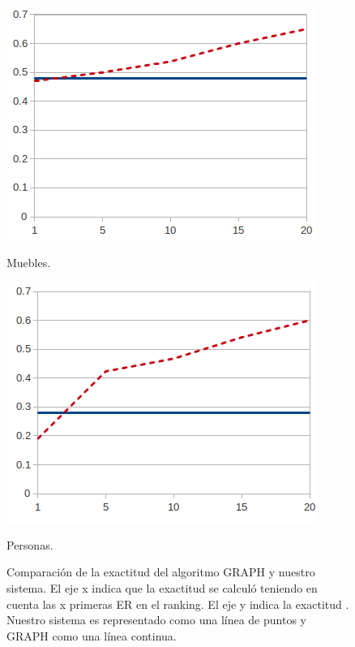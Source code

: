 \begin{table}[H]
\begin{figure}[H]
\begin{minipage}{0.50\linewidth}
\centering
\includegraphics[width=\textwidth]{images/furniturePrec.png}
\caption{Muebles.}
\end{minipage}
\begin{minipage}{0.50\linewidth}
\centering
\includegraphics[width=\textwidth]{images/precP.png}
\caption{Personas.}
\end{minipage}
\caption{Comparaci\'on de la exactitud  del algoritmo GRAPH y nuestro sistema. El eje x indica que la exactitud se calcul\'o teniendo en cuenta las x primeras ER en el ranking. El eje y indica la exactitud . Nuestro sistema es representado como una l\'inea de puntos y GRAPH como una l\'inea continua.\label{graficoPresicion}}
\end{figure}


\end{table}
